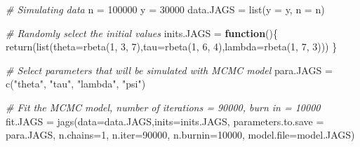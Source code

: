 \documentclass[
]{article}
\newenvironment{Shaded}{\begin{snugshade}}{\end{snugshade}}
\newcommand{\AttributeTok}[1]{\textcolor[rgb]{0.77,0.63,0.00}{#1}}
\newcommand{\CommentTok}[1]{\textcolor[rgb]{0.56,0.35,0.01}{\textit{#1}}}
\newcommand{\ControlFlowTok}[1]{\textcolor[rgb]{0.13,0.29,0.53}{\textbf{#1}}}
\newcommand{\DecValTok}[1]{\textcolor[rgb]{0.00,0.00,0.81}{#1}}
\newcommand{\FunctionTok}[1]{\textcolor[rgb]{0.00,0.00,0.00}{#1}}
\newcommand{\NormalTok}[1]{#1}
\newcommand{\OtherTok}[1]{\textcolor[rgb]{0.56,0.35,0.01}{#1}}
\newcommand{\StringTok}[1]{\textcolor[rgb]{0.31,0.60,0.02}{#1}}
\begin{document}
\begin{Shaded}
\begin{Highlighting}[]
\CommentTok{\# Simulating data}
\NormalTok{n }\OtherTok{=} \DecValTok{100000}
\NormalTok{y }\OtherTok{=} \DecValTok{30000}
\NormalTok{data.JAGS }\OtherTok{=} \FunctionTok{list}\NormalTok{(}\AttributeTok{y =}\NormalTok{ y, }\AttributeTok{n =}\NormalTok{ n)}
\end{Highlighting}
\end{Shaded}

\begin{Shaded}
\begin{Highlighting}[]
\CommentTok{\# Randomly select the initial values}
\NormalTok{inits.JAGS }\OtherTok{=} \ControlFlowTok{function}\NormalTok{()\{}
  \FunctionTok{return}\NormalTok{(}\FunctionTok{list}\NormalTok{(}\AttributeTok{theta=}\FunctionTok{rbeta}\NormalTok{(}\DecValTok{1}\NormalTok{, }\DecValTok{3}\NormalTok{, }\DecValTok{7}\NormalTok{),}\AttributeTok{tau=}\FunctionTok{rbeta}\NormalTok{(}\DecValTok{1}\NormalTok{, }\DecValTok{6}\NormalTok{, }\DecValTok{4}\NormalTok{),}\AttributeTok{lambda=}\FunctionTok{rbeta}\NormalTok{(}\DecValTok{1}\NormalTok{, }\DecValTok{7}\NormalTok{, }\DecValTok{3}\NormalTok{)))}
\NormalTok{\}}
\end{Highlighting}
\end{Shaded}

\begin{Shaded}
\begin{Highlighting}[]
\CommentTok{\# Select parameters that will be simulated with MCMC model}
\NormalTok{para.JAGS }\OtherTok{=} \FunctionTok{c}\NormalTok{(}\StringTok{"theta"}\NormalTok{, }\StringTok{"tau"}\NormalTok{, }\StringTok{"lambda"}\NormalTok{, }\StringTok{"psi"}\NormalTok{)}
\end{Highlighting}
\end{Shaded}

\begin{Shaded}
\begin{Highlighting}[]
\CommentTok{\# Fit the MCMC model, number of iterations = 90000, burn in = 10000}
\NormalTok{fit.JAGS }\OtherTok{=} \FunctionTok{jags}\NormalTok{(}\AttributeTok{data=}\NormalTok{data.JAGS,}\AttributeTok{inits=}\NormalTok{inits.JAGS,}
                \AttributeTok{parameters.to.save =}\NormalTok{ para.JAGS,}
                \AttributeTok{n.chains=}\DecValTok{1}\NormalTok{,}
                \AttributeTok{n.iter=}\DecValTok{90000}\NormalTok{,}
                \AttributeTok{n.burnin=}\DecValTok{10000}\NormalTok{,}
                \AttributeTok{model.file=}\NormalTok{model.JAGS)}
\end{Highlighting}
\end{Shaded}
\end{document}
